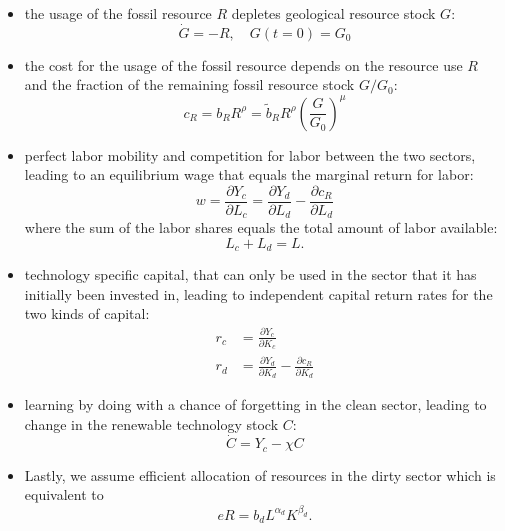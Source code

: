 \begin{itemize}
	\item the usage of the fossil resource $R$ depletes geological resource stock $G$:
		\begin{equation}
			\dot{G} = -R, \quad G(t=0) = G_0
			\label{eq:resource_depletion}
		\end{equation}
	\item the cost for the usage of the fossil resource depends on the resource use $R$ and the fraction of the remaining fossil resource stock $G/G_0$:
		\begin{equation}
			c_R = b_R R^{\rho} = \tilde{b}_R R^{\rho}\left( \frac{G}{G_0} \right)^{\mu}
			\label{eq:resource_cost}
		\end{equation}
	\item perfect labor mobility and competition for labor between the two sectors, leading to an equilibrium wage that equals the marginal return for labor:
		\begin{equation}
			w = \frac{\partial Y_c}{\partial L_c} = \frac{\partial Y_d}{\partial L_d} - \frac{\partial c_R}{\partial L_d}
			\label{eq:equilibrium_wage}
		\end{equation}
		where the sum of the labor shares equals the total amount of labor available:
		\begin{equation}
			L_c + L_d = L.
			\label{eq:population}
		\end{equation}

	\item technology specific capital, that can only be used in the sector that it has initially been invested in, leading to independent capital return rates for the two kinds of capital:
		\begin{align}
			r_c &= \frac{\partial Y_c}{\partial K_c} \label{eq:clean_capital_rent}\\
			r_d &= \frac{\partial Y_d}{\partial K_d} - \frac{\partial c_R}{\partial K_d} \label{eq:dirty_capital_rent}
		\end{align}
	\item learning by doing with a chance of forgetting in the clean sector, leading to change in the renewable technology stock $C$:
		\begin{equation}
			\dot{C} = Y_c - \chi C
			\label{learning_by_doing}
		\end{equation}
	\item Lastly, we assume efficient allocation of resources in the dirty sector which is equivalent to
		\begin{equation}
			e R = b_d L^{\alpha_d}K^{\beta_d}.
			\label{eq:resources}
		\end{equation}
\end{itemize}

